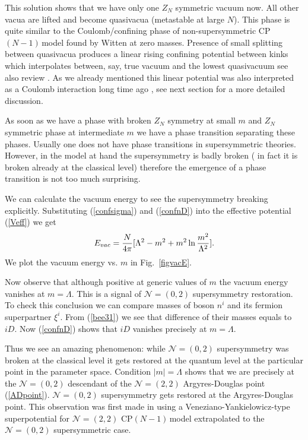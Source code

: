 \documentclass[epsfig,12pt]{article}
\def\beq{\begin{equation}}
\def\eeq{\end{equation}}
\newcommand{\cpn}{CP$(N-1)\,$}
\def\beq{\begin{equation}}
\def\eeq{\end{equation}}
\newcommand{\ntwot}{${\mathcal N}= \left(2,2\right) $ }
\newcommand{\ntwoo}{${\mathcal N}= \left(0,2\right) $ }
\begin{document}
{This solution shows that we have only one $Z_N$ symmetric vacuum now. All other vacua are lifted
and become quasivacua (metastable at large $N$). This phase is quite similar to the Coulomb/confining phase
of non-supersymmetric \cpn model found by Witten \cite{W79} at zero masses. Presence 
of small splitting between quasivacua produces a linear rising confining potential between kinks
which interpolates between, say, true vacuum and the lowest quasivacuum \cite{GSY05}
see also review \cite{SYrev}.
As we already mentioned this linear potential was also interpreted as a Coulomb interaction
long time ago \cite{Coleman,W79}, see  next section for a more detailed discussion.

As soon as we have a phase with broken $Z_N$ symmetry at small $m$ and $Z_N$ symmetric phase at
intermediate $m$ we have a phase transition separating these phases. Usually one does not have phase transitions in supersymmetric theories. However, in the model at hand the supersymmetry is
badly broken ( in fact it is broken already at the classical level) therefore the emergence of 
a phase transition is not too much surprising. 

We can calculate the vacuum energy to see  the supersymmetry breaking explicitly.
Substituting (\ref{confsigma}) and (\ref{confnD}) into the effective potential (\ref{Veff})
we get
\beq
E_{vac}=\frac{N}{4\pi}\large[ \Lambda^2-m^2+m^2\ln {\frac{m^2}{\Lambda^2}}\large].
\label{confEvac}
\eeq
We plot the vacuum energy vs. $m$ in Fig.~\ref{figvacE}.

Now observe that although positive at generic values of $m$ the vacuum energy vanishes
at $m=\Lambda$. This is a signal of \ntwoo supersymmetry restoration. To check this conclusion we can
compare masses of boson $n^i$ and its fermion superpartner $\xi^i$. From (\ref{bee31}) we see that difference of 
their masses equals to $iD$. Now (\ref{confnD}) shows that $iD$ vanishes precisely at $m=\Lambda$.

Thus we see an amazing phenomenon: while \ntwoo supersymmetry was broken at the classical level
it gets restored at the quantum level at the particular point in the parameter space. 
Condition $|m|=\Lambda$ shows that we are precisely at the \ntwoo descendant of the \ntwot 
Argyres-Douglas point (\ref{ADpoint}). \ntwoo supersymmetry gets restored at the Argyres-Douglas point.
This  observation
was  first made in \cite{Tonghetdyn} using a Veneziano-Yankielowicz-type superpotential for  \ntwot \cpn model \cite{AdDVecSal,ChVa,W93}  extrapolated to the \ntwoo supersymmetric case.



}
\end{document}
